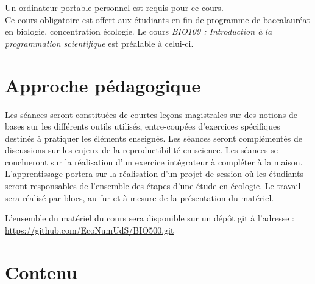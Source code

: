 \documentclass[12]{article}
\begin{document}
	Un ordinateur portable personnel est requis pour ce cours.\\

	Ce cours obligatoire est offert aux étudiants en fin de programme de
	baccalauréat en biologie, concentration écologie. Le cours 
	\textit{BIO109 : Introduction à la programmation scientifique} est préalable à celui-ci.


    \section*{Approche pédagogique} 

	Les séances seront constituées de courtes leçons magistrales sur des notions
	de bases sur les différents outils utilisés, entre-coupées d'exercices
	spécifiques destinés à pratiquer les éléments enseignés. Les séances seront
	complémentés de discussions sur les enjeux de la reproductibilité en science.
	Les séances se conclueront sur la réalisation  d'un exercice intégrateur à
	compléter à la maison. L'apprentissage portera sur la réalisation d'un projet
	de session où les étudiants seront responsables de l'ensemble des étapes d'une
	étude en écologie. Le travail sera réalisé par blocs, au fur et à mesure de la
	présentation du matériel.


	L'ensemble du matériel du cours sera disponible sur un dépôt git à l'adresse :\\
	\url{https://github.com/EcoNumUdS/BIO500.git}

	\section*{Contenu}
\end{document}
